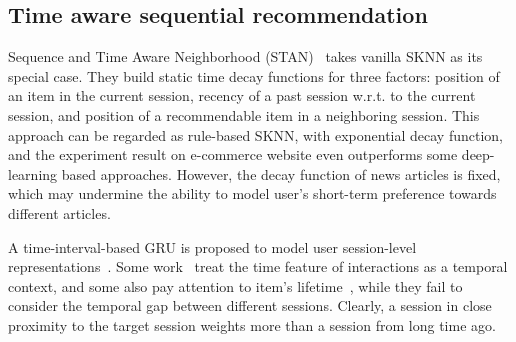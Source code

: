 \subsection{Time aware sequential recommendation}
Sequence and Time Aware Neighborhood (STAN)~\cite{garg2019sequence} takes vanilla SKNN as its special case. They build static time decay functions for three factors: position of an item in the current session, recency of a past session w.r.t. to the current session, and position of a recommendable item in a neighboring session. This approach can be regarded as rule-based SKNN, with exponential decay function, and the experiment result on e-commerce
website even outperforms some deep-learning based approaches. However, the decay function of news articles is fixed, which may undermine the ability to model user's short-term preference towards different articles.

A time-interval-based GRU is proposed to model user session-level representations~\cite{lei_tissa_2019}. Some work~\cite{rakkappan2019context,xu2019time,wu_recommender_2019} treat the time feature of interactions as a temporal context, and some also pay attention to item's lifetime~\cite{wang_modeling_2019}, while they fail to consider the temporal gap between different sessions. Clearly, a session in close proximity to the target session weights more than a session from long time ago.

